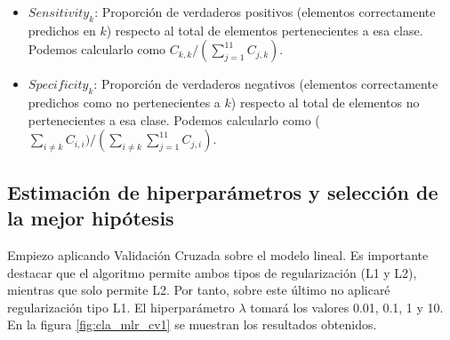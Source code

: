 \documentclass[10pt,a4paper]{article}
\begin{document}
\begin{itemize}
	\item $Sensitivity_k$: Proporción de verdaderos positivos (elementos correctamente predichos en $k$) respecto al total de elementos pertenecientes a esa clase. Podemos calcularlo como $C_{k,k} / (\sum_{j=1}^{11} C_{j,k})$.
	\item $Specificity_k$: Proporción de verdaderos negativos (elementos correctamente predichos como no pertenecientes a $k$) respecto al total de elementos no pertenecientes a esa clase. Podemos calcularlo como ($\sum_{i \neq k} C_{i,i}) / (\sum_{i \neq k} \sum_{j=1}^{11} C_{j,i})$.
\end{itemize}



\subsection{Estimación de hiperparámetros y selección de la mejor hipótesis}

Empiezo aplicando Validación Cruzada sobre el modelo lineal. Es importante destacar que el algoritmo  permite ambos tipos de regularización (L1 y L2), mientras que  solo permite L2. Por tanto, sobre este último no aplicaré regularización tipo L1. El hiperparámetro $\lambda$ tomará los valores 0.01, 0.1, 1 y 10. En la figura \ref{fig:cla_mlr_cv1} se muestran los resultados obtenidos.
\end{document}
